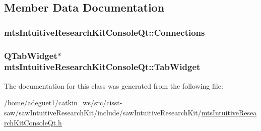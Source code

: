 \subsection{Member Data Documentation}
\hypertarget{classmts_intuitive_research_kit_console_qt_a5fa2b0ac763cd34f9434e1b635cb0504}{
\subsubsection[{Connections}]{ mts\-Intuitive\-Research\-Kit\-Console\-Qt\-::\-Connections\hspace{0.3cm}{\ttfamily [protected]}}}\label{classmts_intuitive_research_kit_console_qt_a5fa2b0ac763cd34f9434e1b635cb0504}
\hypertarget{classmts_intuitive_research_kit_console_qt_a5c8b728139b7d4037c4f43ca2bdc3d96}{
\subsubsection[{Tab\-Widget}]{\setlength{\rightskip}{0pt plus 5cm}Q\-Tab\-Widget$\ast$ mts\-Intuitive\-Research\-Kit\-Console\-Qt\-::\-Tab\-Widget\hspace{0.3cm}{\ttfamily [protected]}}}\label{classmts_intuitive_research_kit_console_qt_a5c8b728139b7d4037c4f43ca2bdc3d96}


The documentation for this class was generated from the following file\-:\begin{DoxyCompactItemize}
\item 
/home/adeguet1/catkin\-\_\-ws/src/cisst-\/saw/saw\-Intuitive\-Research\-Kit/include/saw\-Intuitive\-Research\-Kit/\hyperlink{mts_intuitive_research_kit_console_qt_8h}{mts\-Intuitive\-Research\-Kit\-Console\-Qt.\-h}\end{DoxyCompactItemize}
